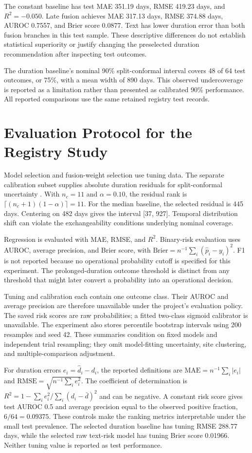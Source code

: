 \documentclass[10pt,letterpaper,twocolumn]{article}
\begin{document}
The constant baseline has test MAE 351.19 days, RMSE 419.23 days, and $R^2=-0.050$. Late fusion achieves MAE 317.13 days, RMSE 374.88 days, AUROC 0.7557, and Brier score 0.0877. Text has lower duration error than both fusion branches in this test sample. These descriptive differences do not establish statistical superiority or justify changing the preselected duration recommendation after inspecting test outcomes.

The duration baseline's nominal 90\% split-conformal interval covers 48 of 64 test outcomes, or 75\%, with a mean width of 890 days. This observed undercoverage is reported as a limitation rather than presented as calibrated 90\% performance. All reported comparisons use the same retained registry test records.

\section{Evaluation Protocol for the Registry Study}

Model selection and fusion-weight selection use tuning data. The separate calibration subset supplies absolute duration residuals for split-conformal uncertainty \cite{conformal}. With $n_c=11$ and $\alpha=0.10$, the residual rank is $\lceil(n_c+1)(1-\alpha)\rceil=11$. For the median baseline, the selected residual is 445 days. Centering on 482 days gives the interval [37, 927]. Temporal distribution shift can violate the exchangeability conditions underlying nominal coverage.

Regression is evaluated with MAE, RMSE, and $R^2$. Binary-risk evaluation uses AUROC, average precision, and Brier score, with $\mathrm{Brier}=n^{-1}\sum_i(\hat p_i-y_i)^2$. F1 is not reported because no operational probability cutoff is specified for this experiment. The prolonged-duration outcome threshold is distinct from any threshold that might later convert a probability into an operational decision.

Tuning and calibration each contain one outcome class. Their AUROC and average precision are therefore unavailable under the project's evaluation policy. The saved risk scores are raw probabilities; a fitted two-class sigmoid calibrator is unavailable. The experiment also stores percentile bootstrap intervals using 200 resamples and seed 42. These summaries condition on fixed models and independent trial resampling; they omit model-fitting uncertainty, site clustering, and multiple-comparison adjustment.

For duration errors $e_i=\hat d_i-d_i$, the reported definitions are $\mathrm{MAE}=n^{-1}\sum_i|e_i|$ and $\mathrm{RMSE}=\sqrt{n^{-1}\sum_i e_i^2}$. The coefficient of determination is $R^2=1-\sum_i e_i^2/\sum_i(d_i-\bar d)^2$ and can be negative. A constant risk score gives test AUROC 0.5 and average precision equal to the observed positive fraction, $6/64=0.09375$. These controls make the ranking metrics interpretable under the small test prevalence. The selected duration baseline has tuning RMSE 288.77 days, while the selected raw text-risk model has tuning Brier score 0.01966. Neither tuning value is reported as test performance.
\end{document}
